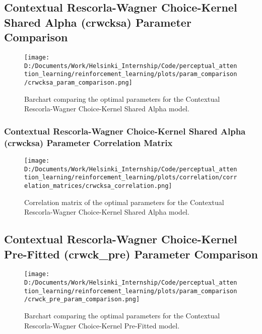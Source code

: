 \documentclass[12pt]{article}
\newcommand{\correlation}{0.25}
\newcommand{\parameter}{0.35}
\begin{document}
\subsection{Contextual Rescorla-Wagner Choice-Kernel Shared Alpha (crwcksa) Parameter Comparison}

\begin{figure}[h]  %
	\centering
	\texttt{[image: D:/Documents/Work/Helsinki\_Internship/Code/perceptual\_attention\_learning/reinforcement\_learning/plots/param\_comparison/crwcksa\_param\_comparison.png]}  %
	\caption{Barchart comparing the optimal parameters for the Contextual Rescorla-Wagner Choice-Kernel Shared Alpha model.}
	\label{fig:crwcksa_model_parmeters}
\end{figure} 

\subsubsection{Contextual Rescorla-Wagner Choice-Kernel Shared Alpha (crwcksa) Parameter Correlation Matrix}

\begin{figure}[h]  %
	\centering
	\texttt{[image: D:/Documents/Work/Helsinki\_Internship/Code/perceptual\_attention\_learning/reinforcement\_learning/plots/correlation/correlation\_matrices/crwcksa\_correlation.png]}  %
	\caption{Correlation matrix of the optimal parameters for the Contextual Rescorla-Wagner Choice-Kernel Shared Alpha model.}
	\label{fig:crwcksa_correlation_matrix}
\end{figure} 
\newpage


\subsection{Contextual Rescorla-Wagner Choice-Kernel Pre-Fitted (crwck\_pre) Parameter Comparison}

\begin{figure}[h]  %
	\centering
	\texttt{[image: D:/Documents/Work/Helsinki\_Internship/Code/perceptual\_attention\_learning/reinforcement\_learning/plots/param\_comparison/crwck\_pre\_param\_comparison.png]}  %
	\caption{Barchart comparing the optimal parameters for the Contextual Rescorla-Wagner Choice-Kernel Pre-Fitted model.}
	\label{fig:crwck_pre_model_parmeters}
\end{figure} 
\end{document}
